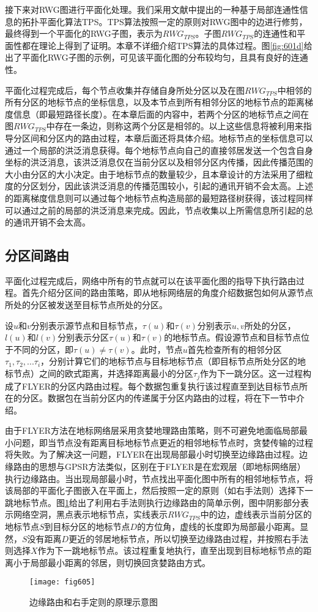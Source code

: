 接下来对RWG图进行平面化处理。我们采用文献中提出的一种基于局部连通性信息的拓扑平面化算法TPS。TPS算法按照一定的原则对RWG图中的边进行修剪，最终得到一个平面化的RWG子图，表示为$RWG_{TPS}$。子图$RWG_{TPS}$的连通性和平面性都在理论上得到了证明。本章不详细介绍TPS算法的具体过程。图\ref{fig:601d}给出了平面化RWG子图的示例，可见该平面化图的分布较均匀，且具有良好的连通性。

平面化过程完成后，每个节点收集并存储自身所处分区以及在图$RWG_{TPS}$中相邻的所有分区的地标节点的坐标信息，以及本节点到所有相邻分区的地标节点的距离梯度信息（即最短路径长度）。在本章后面的内容中，若两个分区的地标节点之间在图$RWG_{TPS}$中存在一条边，则称这两个分区是相邻的。以上这些信息将被利用来指导分区间和分区内的路由过程，本章后面还将具体介绍。地标节点的坐标信息可以通过一个局部的洪泛消息获得。每个地标节点向自己的直接邻居发送一个包含自身坐标的洪泛消息，该洪泛消息仅在当前分区以及相邻分区内传播，因此传播范围的大小由分区的大小决定。由于地标节点的数量较少，且本章设计的方法采用了细粒度的分区划分，因此该洪泛消息的传播范围较小，引起的通讯开销不会太高。上述的距离梯度信息则可以通过每个地标节点构造局部的最短路径树获得，该过程同样可以通过之前的局部的洪泛消息来完成。因此，节点收集以上所需信息所引起的总的通讯开销不会太高。
\subsection{分区间路由}
平面化过程完成后，网络中所有的节点就可以在该平面化图的指导下执行路由过程。首先介绍分区间的路由策略，即从地标网络层的角度介绍数据包如何从源节点所处的分区被发送至目标节点所处的分区。

设$u$和$v$分别表示源节点和目标节点，$\tau(u)$和$\tau(v)$分别表示$u,v$所处的分区，$l(u)$和$l(v)$分别表示分区$\tau(u)$和$\tau(v)$的地标节点。假设源节点和目标节点位于不同的分区，即$\tau(u)\ne\tau(v)$。此时，节点$u$首先检查所有的相邻分区$\tau_1,\tau_2,...\tau_i$，分别计算它们的地标节点与目标地标节点（即目标节点所处分区的地标节点）之间的欧式距离，并选择距离最小的分区$\tau_j$作为下一跳分区。这一过程构成了FLYER的分区内路由过程。每个数据包重复执行该过程直至到达目标节点所在的分区。数据包在当前分区内的传递属于分区内路由的过程，将在下一节中介绍。

由于FLYER方法在地标网络层采用贪婪地理路由策略，则不可避免地面临局部最小问题，即当节点没有距离目标地标节点更近的相邻地标节点时，贪婪传输的过程将失败。为了解决这一问题，FLYER在出现局部最小时切换至边缘路由过程。边缘路由的思想与GPSR方法类似，区别在于FLYER是在宏观层（即地标网络层）执行边缘路由。当出现局部最小时，节点找出平面化图中所有的相邻地标节点，将该局部的平面化子图嵌入在平面上，然后按照一定的原则（如右手法则）选择下一跳地标节点。图\ref{fig:605}给出了利用右手法则执行边缘路由的简单示例，图中阴影部分表示网络空洞，黑点表示地标节点，实线表示$RWG_{TPS}$中的边，虚线表示当前分区的地标节点$S$到目标分区的地标节点$D$的方位角，虚线的长度即为局部最小距离。显然，$S$没有距离$D$更近的邻居地标节点，所以切换至边缘路由过程，并按照右手法则选择$X$作为下一跳地标节点。该过程重复地执行，直至出现到目标地标节点的距离小于局部最小距离的邻居，则切换回贪婪路由方式。
\begin{figure}[h]
\centering
\texttt{[image: fig605]}
\caption{边缘路由和右手定则的原理示意图}
\label{fig:605}
\end{figure}

